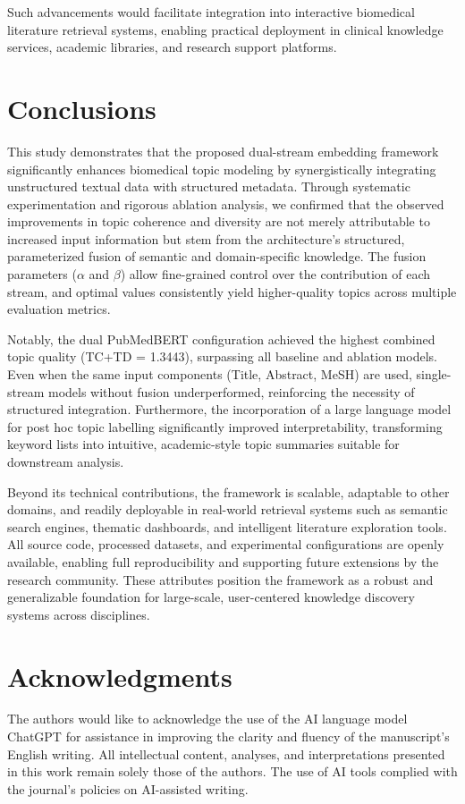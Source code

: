 \documentclass[utf8]{FrontiersinHarvard}
\begin{document}
Such advancements would facilitate integration into interactive biomedical literature retrieval systems, enabling practical deployment in clinical knowledge services, academic libraries, and research support platforms.

\section{Conclusions}

This study demonstrates that the proposed dual-stream embedding framework significantly enhances biomedical topic modeling by synergistically integrating unstructured textual data with structured metadata. Through systematic experimentation and rigorous ablation analysis, we confirmed that the observed improvements in topic coherence and diversity are not merely attributable to increased input information but stem from the architecture's structured, parameterized fusion of semantic and domain-specific knowledge. The fusion parameters ($\alpha$ and $\beta$) allow fine-grained control over the contribution of each stream, and optimal values consistently yield higher-quality topics across multiple evaluation metrics.

Notably, the dual PubMedBERT configuration achieved the highest combined topic quality (TC+TD = 1.3443), surpassing all baseline and ablation models. Even when the same input components (Title, Abstract, MeSH) are used, single-stream models without fusion underperformed, reinforcing the necessity of structured integration. Furthermore, the incorporation of a large language model for post hoc topic labelling significantly improved interpretability, transforming keyword lists into intuitive, academic-style topic summaries suitable for downstream analysis.

Beyond its technical contributions, the framework is scalable, adaptable to other domains, and readily deployable in real-world retrieval systems such as semantic search engines, thematic dashboards, and intelligent literature exploration tools. All source code, processed datasets, and experimental configurations are openly available, enabling full reproducibility and supporting future extensions by the research community. These attributes position the framework as a robust and generalizable foundation for large-scale, user-centered knowledge discovery systems across disciplines.

\section*{Acknowledgments}
The authors would like to acknowledge the use of the AI language model ChatGPT for assistance in improving the clarity and fluency of the manuscript's English writing. All intellectual content, analyses, and interpretations presented in this work remain solely those of the authors. The use of AI tools complied with the journal's policies on AI-assisted writing.
\end{document}

